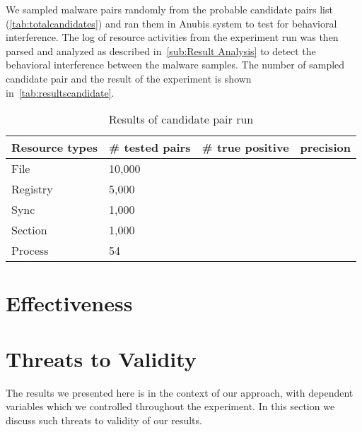 We sampled malware pairs randomly from the probable candidate pairs list (\autoref{tab:totalcandidates}) and ran them in Anubis system to test for behavioral interference.
The log of resource activities from the experiment run was then parsed and analyzed as described in~\autoref{sub:Result Analysis} to detect the behavioral interference between the malware samples.
The number of sampled candidate pair and the result of the experiment is shown in~\autoref{tab:resultscandidate}.
\begin{table}[ht]
  \caption[Results of candidate pair run]{Results of candidate pair run}\label{tab:resultscandidate}
  \centering
  \begin{tabular}{l l l l}
    \toprule
    Resource types & \# tested pairs & \# true positive & precision\\
    \midrule
    File & 10,000\\
    Registry & 5,000\\
    Sync & 1,000\\
    Section & 1,000\\
    Process & 54\\
    \bottomrule
  \end{tabular}
\end{table}
\section{Effectiveness}
\label{sec:Effectiveness}

\section{Threats to Validity}
\label{sec:Threats to Validity}
The results we presented here is in the context of our approach, with dependent variables which we controlled throughout the experiment.
In this section we discuss such threats to validity of our results.

